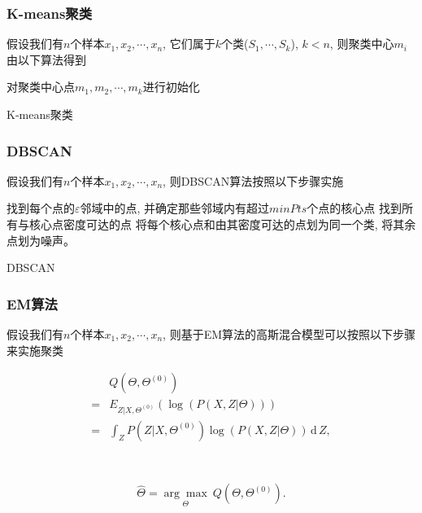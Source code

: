 \documentclass[10pt]{beamer}
\begin{document}
{\begin{frame}[c]
    \frametitle{K-means聚类}
    假设我们有$n$个样本$x_1, x_2, \cdots, x_n$, 它们属于$k$个类($S_1,\cdots,S_k$), $k<n$, 则聚类中心$m_i$由以下算法得到

    \vspace{10pt}
    \begin{algorithm}[H]
        \SetAlgoLined
        对聚类中心点$m_1, m_2, \cdots, m_k$进行初始化\; 
        \caption{K-means聚类}
    \end{algorithm}
\end{frame}

\begin{frame}[c]
    \frametitle{DBSCAN}
    假设我们有$n$个样本$x_1, x_2, \cdots, x_n$, 则DBSCAN算法按照以下步骤实施

    \vspace{10pt}
    \begin{algorithm}[H]
        \SetAlgoLined
        找到每个点的$\varepsilon$邻域中的点, 并确定那些邻域内有超过$minPts$个点的核心点\; 
        找到所有与核心点密度可达的点\; 
        将每个核心点和由其密度可达的点划为同一个类, 将其余点划为噪声。
        \caption{DBSCAN}
    \end{algorithm}
\end{frame}

\begin{frame}[c]
    \frametitle{EM算法}
    {\small
    假设我们有$n$个样本$x_1, x_2, \cdots, x_n$, 则基于EM算法的高斯混合模型可以按照以下步骤来实施聚类
    \\\begin{minipage}{.55\textwidth}
        \small
        \begin{equation}
        \label{equ:Complete-Likelihood}
        \begin{aligned}
            &Q(\Theta, \Theta^{(0)})\\ =& E_{Z|X,\Theta^{(0)}}\left (\log (P(X,Z|\Theta)) \right) \\
            =&\int_Z P(Z|X,\Theta^{(0)}) \log (P(X,Z|\Theta))\,\text{d}\,Z, 
        \end{aligned}
        \end{equation}
    \end{minipage}\ 
    \begin{minipage}{.4\textwidth}
        \small
        \begin{equation}
        \label{equ:EM-max}
        \hat{\Theta} = \underset{\Theta}{\arg\max}\ Q(\Theta, \Theta^{(0)}). 
        \end{equation}
    \end{minipage}

}
\end{frame}}
\end{document}
